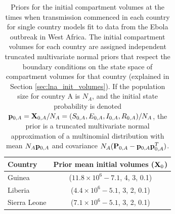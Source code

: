 \begin{table}[htbp]
	\caption[Priors for initial compartment volumes for single country models fit to data from the Ebola outbreak in West Africa.]{Priors for the initial compartment volumes at the times when transmission commenced in each country for single country models fit to data from the Ebola outbreak in West Africa. The initial compartment volumes for each country are assigned independent truncated multivariate normal priors that respect the boundary conditions on the state space of compartment volumes for that country (explained in Section \ref{sec:lna_init_volumes}). If the population size for country A is $ N_A $, and the initial state probability is denoted $ \mathbf{p}_{0,A} = \mathbf{X}_{0,A}/N_A  = (S_{0,A}, E_{0,A}, I_{0,A}, R_{0,A})/N_A$, the prior is a truncated multivariate normal approximation of a multinomial distribution with mean $ N_A\mathbf{p}_{0,A}$ and covariance $ N_A(\mathbf{P}_{0,A} - \mathbf{p}_{0,A}\mathbf{p}_{0,A}^T) $.} 
	\label{tab:ebola_single_initdist_priors}
	\centering
	\begin{tabular}{lc}
		\hline \textbf{Country} & \textbf{Prior mean initial volumes} ($ \mathbf{X}_0 $) \\
		\hline
		Guinea & ($ 11.8\times10^6 -7.1$, 4, 3, 0.1) \\
		Liberia & ($ 4.4\times10^6 -5.1$, 3, 2, 0.1) \\
		Sierra Leone & ($ 7.1\times10^6 -5.1$, 3, 2, 0.1) \\
		\hline
	\end{tabular}
\end{table}

